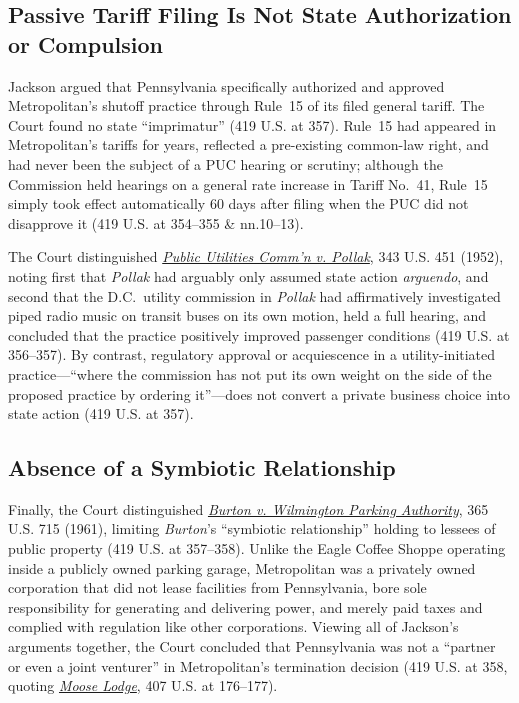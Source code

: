 \documentclass[12pt]{article}
\begin{document}
\subsection{Passive Tariff Filing Is Not State Authorization or Compulsion}
Jackson argued that Pennsylvania specifically authorized and approved Metropolitan's shutoff practice through Rule~15 of its filed general tariff. The Court found no state ``imprimatur'' (419 U.S. at 357). Rule~15 had appeared in Metropolitan's tariffs for years, reflected a pre-existing common-law right, and had never been the subject of a PUC hearing or scrutiny; although the Commission held hearings on a general rate increase in Tariff No.~41, Rule~15 simply took effect automatically 60 days after filing when the PUC did not disapprove it (419 U.S. at 354--355 \& nn.10--13).

The Court distinguished \href{https://supreme.justia.com/cases/federal/us/343/451/}{\emph{Public Utilities Comm'n v. Pollak}}, 343 U.S. 451 (1952), noting first that \emph{Pollak} had arguably only assumed state action \emph{arguendo}, and second that the D.C.\ utility commission in \emph{Pollak} had affirmatively investigated piped radio music on transit buses on its own motion, held a full hearing, and concluded that the practice positively improved passenger conditions (419 U.S. at 356--357). By contrast, regulatory approval or acquiescence in a utility-initiated practice---``where the commission has not put its own weight on the side of the proposed practice by ordering it''---does not convert a private business choice into state action (419 U.S. at 357).

\subsection{Absence of a Symbiotic Relationship}
Finally, the Court distinguished \href{https://supreme.justia.com/cases/federal/us/365/715/}{\emph{Burton v. Wilmington Parking Authority}}, 365 U.S. 715 (1961), limiting \emph{Burton}'s ``symbiotic relationship'' holding to lessees of public property (419 U.S. at 357--358). Unlike the Eagle Coffee Shoppe operating inside a publicly owned parking garage, Metropolitan was a privately owned corporation that did not lease facilities from Pennsylvania, bore sole responsibility for generating and delivering power, and merely paid taxes and complied with regulation like other corporations. Viewing all of Jackson's arguments together, the Court concluded that Pennsylvania was not a ``partner or even a joint venturer'' in Metropolitan's termination decision (419 U.S. at 358, quoting \href{https://supreme.justia.com/cases/federal/us/407/163/}{\emph{Moose Lodge}}, 407 U.S. at 176--177).
\end{document}
